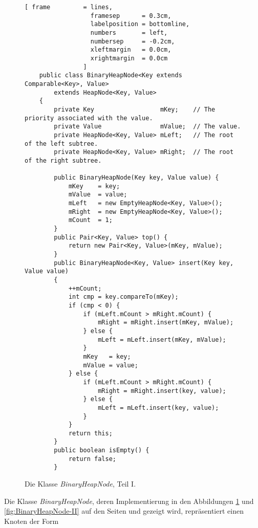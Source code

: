 \begin{figure}[!h]
  \centering
\begin{Verbatim}[ frame         = lines, 
                  framesep      = 0.3cm, 
                  labelposition = bottomline,
                  numbers       = left,
                  numbersep     = -0.2cm,
                  xleftmargin   = 0.0cm,
                  xrightmargin  = 0.0cm
                ]
    public class BinaryHeapNode<Key extends Comparable<Key>, Value> 
        extends HeapNode<Key, Value>
    {
        private Key                  mKey;    // The priority associated with the value.
        private Value                mValue;  // The value.
        private HeapNode<Key, Value> mLeft;   // The root of the left subtree.
        private HeapNode<Key, Value> mRight;  // The root of the right subtree.
    
        public BinaryHeapNode(Key key, Value value) {
            mKey    = key;
            mValue  = value;
            mLeft   = new EmptyHeapNode<Key, Value>();
            mRight  = new EmptyHeapNode<Key, Value>();
            mCount  = 1;
        }    
        public Pair<Key, Value> top() {
            return new Pair<Key, Value>(mKey, mValue);
        }
        public BinaryHeapNode<Key, Value> insert(Key key, Value value)
        {
            ++mCount;
            int cmp = key.compareTo(mKey);
            if (cmp < 0) {                         
                if (mLeft.mCount > mRight.mCount) {
                    mRight = mRight.insert(mKey, mValue);
                } else {
                    mLeft = mLeft.insert(mKey, mValue);
                }
                mKey   = key;
                mValue = value;
            } else {
                if (mLeft.mCount > mRight.mCount) {
                    mRight = mRight.insert(key, value);
                } else {
                    mLeft = mLeft.insert(key, value);
                }
            }
            return this;
        }        
        public boolean isEmpty() {
            return false;
        }
\end{Verbatim}
\vspace*{-0.3cm}
  \caption{Die Klasse \textsl{BinaryHeapNode}, Teil I.}
  \label{fig:BinaryHeapNode-I}
\end{figure}
Die Klasse \textsl{BinaryHeapNode}, deren Implementierung in den Abbildungen
\ref{fig:BinaryHeapNode-I} und \ref{fig:BinaryHeapNode-II} auf den Seiten
\pageref{fig:BinaryHeapNode-I} und \pageref{fig:BinaryHeapNode-II} gezeigt wird,
repr\"asentiert einen Knoten der Form \\[0.1cm]
